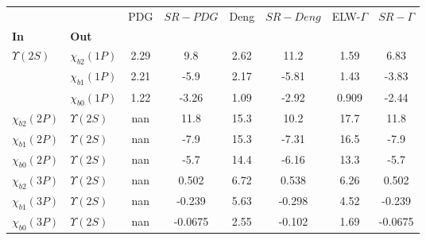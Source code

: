 \begin{tabular}{l|l|c|c|c|c|c|c}
\toprule
                &                &  PDG & $SR-PDG$ &  Deng & $SR-Deng$ &  ELW-$\Gamma$ & $SR-\Gamma$ \\
\textbf{In} & \textbf{Out} &      &          &       &           &               &             \\
\midrule
\textbf{$\Upsilon(2S)$} & \textbf{$\chi_{b2}(1P)$} & 2.29 &      9.8 &  2.62 &      11.2 &          1.59 &        6.83 \\
                & \textbf{$\chi_{b1}(1P)$} & 2.21 &     -5.9 &  2.17 &     -5.81 &          1.43 &       -3.83 \\
                & \textbf{$\chi_{b0}(1P)$} & 1.22 &    -3.26 &  1.09 &     -2.92 &         0.909 &       -2.44 \\
\textbf{$\chi_{b2}(2P)$} & \textbf{$\Upsilon(2S)$} &  nan &     11.8 &  15.3 &      10.2 &          17.7 &        11.8 \\
\textbf{$\chi_{b1}(2P)$} & \textbf{$\Upsilon(2S)$} &  nan &     -7.9 &  15.3 &     -7.31 &          16.5 &        -7.9 \\
\textbf{$\chi_{b0}(2P)$} & \textbf{$\Upsilon(2S)$} &  nan &     -5.7 &  14.4 &     -6.16 &          13.3 &        -5.7 \\
\textbf{$\chi_{b2}(3P)$} & \textbf{$\Upsilon(2S)$} &  nan &    0.502 &  6.72 &     0.538 &          6.26 &       0.502 \\
\textbf{$\chi_{b1}(3P)$} & \textbf{$\Upsilon(2S)$} &  nan &   -0.239 &  5.63 &    -0.298 &          4.52 &      -0.239 \\
\textbf{$\chi_{b0}(3P)$} & \textbf{$\Upsilon(2S)$} &  nan &  -0.0675 &  2.55 &    -0.102 &          1.69 &     -0.0675 \\
\bottomrule
\end{tabular}
